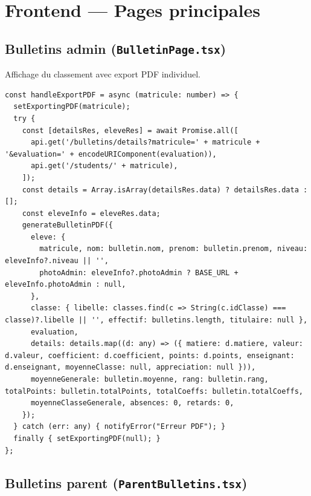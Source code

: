 \documentclass[12pt,a4paper]{article}
\begin{document}
\newpage

\section{Frontend --- Pages principales}

\subsection{Bulletins admin (\texttt{BulletinPage.tsx})}

Affichage du classement avec export PDF individuel.

\begin{lstlisting}[style=code]
const handleExportPDF = async (matricule: number) => {
  setExportingPDF(matricule);
  try {
    const [detailsRes, eleveRes] = await Promise.all([
      api.get('/bulletins/details?matricule=' + matricule + '&evaluation=' + encodeURIComponent(evaluation)),
      api.get('/students/' + matricule),
    ]);
    const details = Array.isArray(detailsRes.data) ? detailsRes.data : [];
    const eleveInfo = eleveRes.data;
    generateBulletinPDF({
      eleve: {
        matricule, nom: bulletin.nom, prenom: bulletin.prenom, niveau: eleveInfo?.niveau || '',
        photoAdmin: eleveInfo?.photoAdmin ? BASE_URL + eleveInfo.photoAdmin : null,
      },
      classe: { libelle: classes.find(c => String(c.idClasse) === classe)?.libelle || '', effectif: bulletins.length, titulaire: null },
      evaluation,
      details: details.map((d: any) => ({ matiere: d.matiere, valeur: d.valeur, coefficient: d.coefficient, points: d.points, enseignant: d.enseignant, moyenneClasse: null, appreciation: null })),
      moyenneGenerale: bulletin.moyenne, rang: bulletin.rang, totalPoints: bulletin.totalPoints, totalCoeffs: bulletin.totalCoeffs,
      moyenneClasseGenerale, absences: 0, retards: 0,
    });
  } catch (err: any) { notifyError("Erreur PDF"); }
  finally { setExportingPDF(null); }
};
\end{lstlisting}

\subsection{Bulletins parent (\texttt{ParentBulletins.tsx})}
\end{document}
